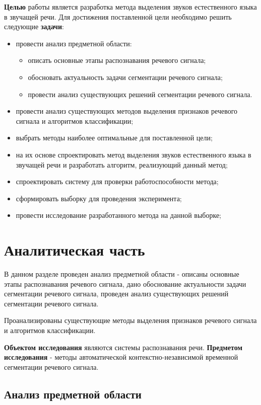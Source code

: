 \documentclass[utf8x, 14pt, oneside, a4paper]{article}
\begin{document}
	{\bf Целью} работы является разработка метода выделения звуков естественного языка в звучащей речи. Для достижения поставленной цели необходимо решить следующие {\bf задачи}:
	\begin{itemize}
		\item провести анализ предметной области:
		\begin{itemize}
			\item описать основные этапы распознавания речевого сигнала;
			\item обосновать актуальность задачи сегментации речевого сигнала;
			\item провести анализ существующих решений сегментации речевого сигнала.
		\end{itemize}
		\item провести анализ существующих методов выделения признаков речевого сигнала и алгоритмов классификации;
		\item выбрать методы наиболее оптимальные для поставленной цели;
		\item на их основе спроектировать метод выделения звуков естественного языка в звучащей речи и разработать алгоритм, реализующий данный метод;
		\item спроектировать систему для проверки работоспособности метода;
		\item сформировать выборку для проведения эксперимента;
		\item провести исследование разработанного метода на данной выборке;
	\end{itemize}
	
	\pagebreak
	
	\section{Аналитическая часть}
	
	В данном разделе проведен анализ предметной области - описаны основные этапы распознавания речевого сигнала, дано обоснование актуальности задачи сегментации речевого сигнала, проведен анализ существующих решений сегментации речевого сигнала. 
	
	Проанализированы существующие методы выделения признаков речевого сигнала и алгоритмов классификации.
	
	{\bf Объектом исследования} являются системы распознавания речи. {\bf Предметом исследования} - методы автоматической контекстно-независимой временной сегментации речевого сигнала.
	
	\subsection{Анализ предметной области}
	
\end{document}
